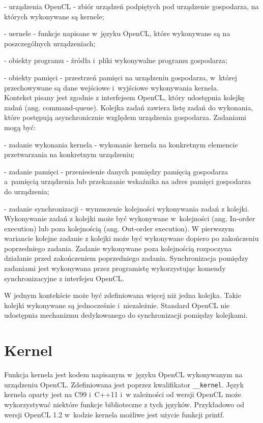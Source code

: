 - urządzenia OpenCL - zbiór urządzeń podpiętych pod urządzenie gospodarza, na których wykonywane są kernele;

- uernele - funkcje napisane w~języku OpenCL, które wykonywane są na poszczególnych urządzeniach;

- obiekty programu - źródła i~pliki wykonywalne programu gospodarza;

- obiekty pamięci - przestrzeń pamięci na urządzeniu gospodarza, w~której przechowywane są dane wejściowe i~wyjściowe wykonywania kernela.
\\
Kontekst pisany jest zgodnie z interfejsem OpenCL, który udostępnia kolejkę zadań (ang. command-queue). Kolejka zadań zawiera listę zadań do wykonania, które postępują asynchronicznie względem urządzenia gospodarza. Zadaniami mogą być:

- zadanie wykonania kernela - wykonanie kernela na konkretnym elemencie przetwarzania na konkretnym urządzeniu;

- zadanie pamięci - przeniesienie danych pomiędzy pamięcią gospodarza a~pamięcią urządzenia lub przekazanie wskaźnika na adres pamięci gospodarza do urządzenia;

- zadanie synchronizacji - wymuszenie kolejności wykonywania zadań z kolejki.
\\
Wykonywanie zadań z kolejki może być wykonywane w~kolejności (ang. In-order execution) lub poza kolejnością (ang. Out-order execution). W pierwszym wariancie kolejne zadanie z kolejki może być wykonywane dopiero po zakończeniu poprzedniego zadania. Zadanie wykonywane poza kolejnością rozpoczyna działanie przed zakończeniem poprzedniego zadania. Synchronizacja pomiędzy zadaniami jest wykonywana przez programistę wykorzystując komendy synchronizacyjne z interfejsu OpenCL.

W jednym kontekście może być zdefiniowana więcej niż jedna kolejka. Takie kolejki wykonywane są jednocześnie i~niezależnie. Standard OpenCL nie udostępnia mechanizmu dedykowanego do synchronizacji pomiędzy kolejkami.


\section{Kernel}\label{sec:OpenC4L}

Funkcja kernela jest kodem napisanym w~języku OpenCL wykonywanym na urządzeniu OpenCL. Zdefiniowana jest poprzez kwalifikator \verb|__kernel|. Język kernela oparty jest na C99 i~C++11 i~w zależności od wersji OpenCL może wykorzystywać niektóre funkcje biblioteczne z tych języków. Przykładowo od wersji OpenCL 1.2 w~kodzie kernela możliwe jest użycie funkcji printf.

